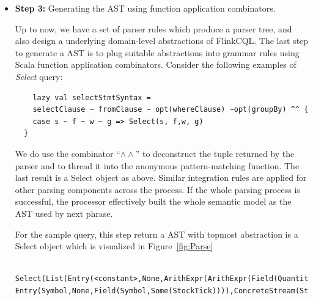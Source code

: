 \begin{itemize}
\begin{lstlisting}
	case class Entry[T](name: String, alias: Option[String], expr: Expr[T])
\end{lstlisting}

We are then able to access to this \textit{Entry}'s expression \textit{expr}. Hence, we are able to build up a complete semantic model for FlinkCQL using a top-down approach.

\item \textbf{Step 3:} Generating the AST using function application combinators.

Up to now, we have a set of parser rules which produce a parser tree, and also design a underlying domain-level abstractions of FlinkCQL. The last step to generate a AST is to plug suitable abstractions into grammar rules using Scala function application combinators. Consider the following examples of \textit{Select} query:

\begin{lstlisting}
	lazy val selectStmtSyntax = 
	selectClause ~ fromClause ~ opt(whereClause) ~opt(groupBy) ^^ {
    case s ~ f ~ w ~ g => Select(s, f,w, g)
  }
\end{lstlisting}

We do use the combinator ``$\wedge \wedge$'' to deconstruct the tuple returned by the parser and to thread it into the anonymous pattern-matching function. The last result is a Select object as above. Similar integration rules are applied for other parsing components across the process. 
If the whole parsing process is successful, the processor effectively built the whole semantic model as the AST used by next phrase.

For the sample query, this step return a AST with topmost abstraction is a Select object which is visualized in Figure~\ref{fig:Parse}

\begin{lstlisting}
	Select(List(Entry(<constant>,None,ArithExpr(ArithExpr(Field(Quantity,Some(s)),*,Field(Price,None)),+,Constant((Double,Double),10.2,double))), Entry(Symbol,None,Field(Symbol,Some(StockTick)))),ConcreteStream(Stream(StockTick,Some(s),false),None,None),None,None)
\end{lstlisting}
 

\end{itemize}


